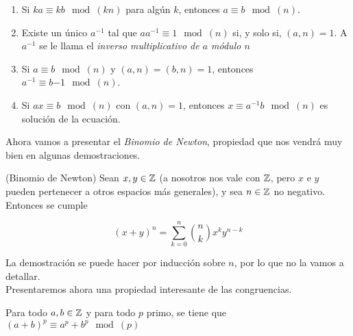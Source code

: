 \begin{proposicion}
\begin{enumerate}
		\item Si $ka \equiv kb \mod(kn)$ para algún $k$, entonces $a \equiv b \mod(n)$.
		
		\item Existe un único $a^{-1}$ tal que $aa^{-1} \equiv 1 \mod(n)$ si, y solo si, $(a, n) = 1$. A $a^{-1}$ se le llama el \textit{inverso multiplicativo de $a$ módulo $n$}
		
		\item Si $a \equiv b \mod(n)$ y $(a, n) = (b, n) = 1$, entonces $a^{-1} \equiv b{-1} \mod(n)$.
		
		\item Si $ax \equiv b \mod(n)$ con $(a, n) = 1$, entonces $x \equiv a^{-1}b \mod(n)$ es solución de la ecuación.
	\end{enumerate}
\end{proposicion}

Ahora vamos a presentar el \textit{Binomio de Newton}, propiedad que nos vendrá muy bien en algunas demostraciones.

\begin{teorema}{(Binomio de Newton)}\label{binomio_de_newton}
	Sean $x, y \in \mathbb{Z}$ (a nosotros nos vale con $\mathbb{Z}$, pero $x$ e $y$ pueden pertenecer a otros espacios más generales), y sea $n \in \mathbb{Z}$ no negativo. Entonces se cumple
	
	\[ (x + y)^n = \sum_{k=0}^{n}\binom{n}{k}x^ky^{n-k} \]
\end{teorema}

La demostración se puede hacer por inducción sobre $n$, por lo que no la vamos a detallar.\\

Presentaremos ahora una propiedad interesante de las congruencias.

\begin{lema}
	Para todo $a, b \in \mathbb{Z}$ y para todo $p$ primo, se tiene que $(a + b)^p \equiv a^p + b^p \mod(p)$
\end{lema}

